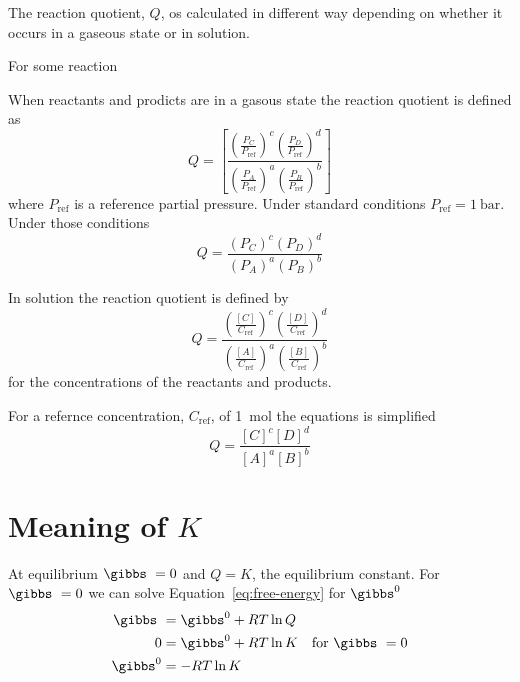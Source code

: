 \documentclass[../mit-general-chemistry.tex]{subfiles}
\begin{document}
The reaction quotient, $Q$, os calculated in different way depending
on whether it occurs in a gaseous state or in solution.

For some reaction


When reactants and prodicts are in a gasous state the reaction
quotient is defined as
\begin{equation}
  Q =
  \left[
    \frac{
      \left( \frac{P_C}{P_{\text{ref}}} \right)^c
      \left( \frac{P_D}{P_{\text{ref}}} \right)^d
    }{
      \left( \frac{P_A}{P_{\text{ref}}} \right)^a
      \left( \frac{P_B}{P_{\text{ref}}} \right)^b
    }
    \right]
\end{equation}
where $P_{\text{ref}}$ is a reference partial pressure. Under standard
conditions $P_{\text{ref}} = \SI{1}{\bar}$. Under those conditions
\begin{equation}
  Q =
  \frac{
    (P_C)^c
    (P_D)^d
  }{
    (P_A)^a
    (P_B)^b
  }
\end{equation}


In solution the reaction quotient is defined by
\begin{equation}
  Q = \frac{
    \left( \frac{[C]}{C_{\text{ref}}} \right)^c
    \left( \frac{[D]}{C_{\text{ref}}} \right)^d
  }{
    \left( \frac{[A]}{C_{\text{ref}}} \right)^a
    \left( \frac{[B]}{C_{\text{ref}}} \right)^b
  }
\end{equation}
for the concentrations of the reactants and products.

For a refernce concentration, $C_{\text{ref}}$, of \SI{1}{\mol} the
equations is simplified
\begin{equation}
  Q = \frac{ [C]^c [D]^d }{ [A]^a [B]^b }
\end{equation}











\section{Meaning of $K$}



At equilibrium $\gibbs\ = 0$ and $Q = K$, the equilibrium constant. For
$\gibbs\ = 0$ we can solve Equation~\ref{eq:free-energy} for $\gibbs^0$
\begin{align*}
  \gibbs\ &= \gibbs^0 + RT \ln Q \\
  0 &= \gibbs^0 + RT \ln K & \text{for } \gibbs\ = 0 \\
  \gibbs^0 &= -RT \ln K \\
\end{align*}
\end{document}
